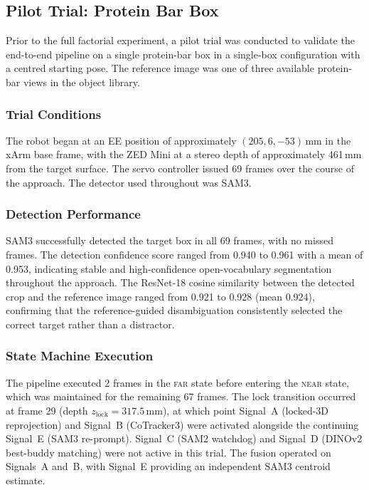 \documentclass[lettersize,journal]{IEEEtran}
\begin{document}
\subsection{Pilot Trial: Protein Bar Box}
\label{sec:pilot}

Prior to the full factorial experiment, a pilot trial was conducted to
validate the end-to-end pipeline on a single protein-bar box in a
single-box configuration with a centred starting pose.  The reference image
was one of three available protein-bar views in the object library.

\subsubsection{Trial Conditions}

The robot began at an EE position of approximately
$(205, 6, -53)$\,mm in the xArm base frame, with the ZED Mini at a
stereo depth of approximately 461\,mm from the target surface.  The servo
controller issued 69 frames over the course of the approach.  The detector
used throughout was SAM3.

\subsubsection{Detection Performance}

SAM3 successfully detected the target box in all 69 frames, with no missed
frames.  The detection confidence score ranged from 0.940 to 0.961 with a
mean of 0.953, indicating stable and high-confidence open-vocabulary
segmentation throughout the approach.  The ResNet-18 cosine similarity
between the detected crop and the reference image ranged from 0.921 to
0.928 (mean 0.924), confirming that the reference-guided disambiguation
consistently selected the correct target rather than a distractor.

\subsubsection{State Machine Execution}

The pipeline executed 2 frames in the \textsc{far} state before
entering the \textsc{near} state, which was maintained for the remaining
67 frames.  The lock transition occurred at frame 29 (depth
$z_{\text{lock}} = 317.5$\,mm), at which point Signal~A (locked-3D
reprojection) and Signal~B (CoTracker3) were activated alongside the
continuing Signal~E (SAM3 re-prompt).  Signal~C (SAM2 watchdog) and
Signal~D (DINOv2 best-buddy matching) were not active in this trial.
The fusion operated on Signals~A and~B, with Signal~E providing an
independent SAM3 centroid estimate.
\end{document}
